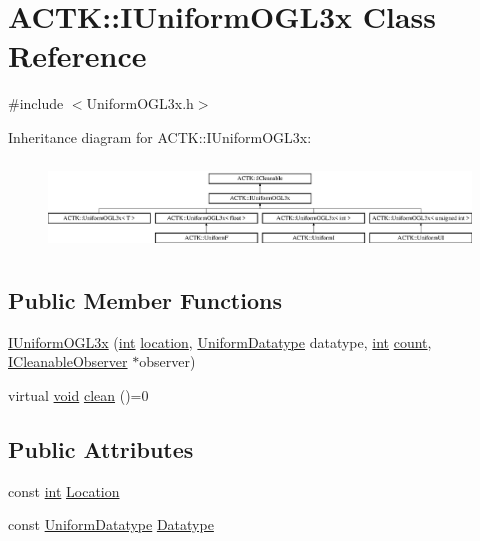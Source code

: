 \hypertarget{class_a_c_t_k_1_1_i_uniform_o_g_l3x}{\section{A\-C\-T\-K\-:\-:I\-Uniform\-O\-G\-L3x Class Reference}
\label{class_a_c_t_k_1_1_i_uniform_o_g_l3x}
}


{\ttfamily \#include $<$Uniform\-O\-G\-L3x.\-h$>$}

Inheritance diagram for A\-C\-T\-K\-:\-:I\-Uniform\-O\-G\-L3x\-:\begin{figure}[H]
\begin{center}
\leavevmode
\includegraphics[height=2.393162cm]{class_a_c_t_k_1_1_i_uniform_o_g_l3x}
\end{center}
\end{figure}
\subsection*{Public Member Functions}
\begin{DoxyCompactItemize}
\item 
\hyperlink{class_a_c_t_k_1_1_i_uniform_o_g_l3x_a73e56ada78dfa7089a29ee1b01f1a565}{I\-Uniform\-O\-G\-L3x} (\hyperlink{wglew_8h_a500a82aecba06f4550f6849b8099ca21}{int} \hyperlink{glew_8h_a050778a7129cc14e57da7024beb87ce8}{location}, \hyperlink{namespace_a_c_t_k_a0206df759d1628359ad73c2acea69d0e}{Uniform\-Datatype} datatype, \hyperlink{wglew_8h_a500a82aecba06f4550f6849b8099ca21}{int} \hyperlink{glew_8h_a10b284d589000663becfbc6867a3a9f7}{count}, \hyperlink{class_a_c_t_k_1_1_i_cleanable_observer}{I\-Cleanable\-Observer} $\ast$observer)
\item 
virtual \hyperlink{wglew_8h_aeea6e3dfae3acf232096f57d2d57f084}{void} \hyperlink{class_a_c_t_k_1_1_i_uniform_o_g_l3x_ab6dfea81a3fe26e6bf3384b4587e0328}{clean} ()=0
\end{DoxyCompactItemize}
\subsection*{Public Attributes}
\begin{DoxyCompactItemize}
\item 
const \hyperlink{wglew_8h_a500a82aecba06f4550f6849b8099ca21}{int} \hyperlink{class_a_c_t_k_1_1_i_uniform_o_g_l3x_ab0346a19e03f102ae1e93481030f453e}{Location}
\item 
const \hyperlink{namespace_a_c_t_k_a0206df759d1628359ad73c2acea69d0e}{Uniform\-Datatype} \hyperlink{class_a_c_t_k_1_1_i_uniform_o_g_l3x_abec36a4d8438055654059624f02408f9}{Datatype}
\end{DoxyCompactItemize}
